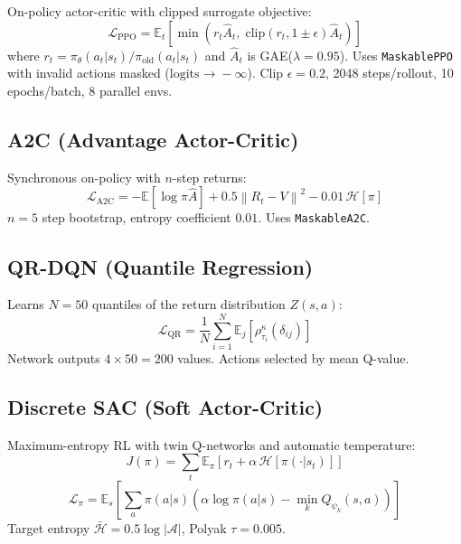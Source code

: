 \documentclass[conference, 10pt]{IEEEtran}
\begin{document}
On-policy actor-critic with clipped surrogate objective:
\begin{equation}
\mathcal{L}_{\text{PPO}}=\mathbb{E}_t\!\left[\min\!\left(r_t\hat{A}_t,\;\text{clip}(r_t,1{\pm}\epsilon)\hat{A}_t\right)\right]
\end{equation}
where $r_t=\pi_\theta(a_t|s_t)/\pi_{\text{old}}(a_t|s_t)$ and $\hat{A}_t$ is GAE($\lambda{=}0.95$).  Uses \texttt{MaskablePPO} with invalid actions masked ($\text{logits}\!\to\!{-}\infty$).  Clip $\epsilon{=}0.2$, 2048 steps/rollout, 10 epochs/batch, 8 parallel envs.

\subsection{A2C (Advantage Actor-Critic)}

Synchronous on-policy with $n$-step returns:
\begin{equation}
\mathcal{L}_{\text{A2C}}=-\mathbb{E}\!\left[\log\pi\hat{A}\right]+0.5\left\|R_t-V\right\|^2-0.01\,\mathcal{H}[\pi]
\end{equation}
$n{=}5$ step bootstrap, entropy coefficient $0.01$.  Uses \texttt{MaskableA2C}.

\subsection{QR-DQN (Quantile Regression)}

Learns $N{=}50$ quantiles of the return distribution $Z(s,a)$:
\begin{equation}
\mathcal{L}_{\text{QR}}=\frac{1}{N}\sum_{i=1}^{N}\mathbb{E}_{j}\!\left[\rho_{\tau_i}^\kappa(\delta_{ij})\right]
\end{equation}
Network outputs $4{\times}50{=}200$ values.  Actions selected by mean Q-value.

\subsection{Discrete SAC (Soft Actor-Critic)}

Maximum-entropy RL with twin Q-networks and automatic temperature:
\begin{equation}
J(\pi)=\sum_t\mathbb{E}_\pi\!\left[r_t+\alpha\,\mathcal{H}\!\left[\pi(\cdot|s_t)\right]\right]
\end{equation}
\begin{equation}
\mathcal{L}_\pi=\mathbb{E}_s\!\left[\sum_a\pi(a|s)\!\left(\alpha\log\pi(a|s)-\min_k Q_{\psi_k}(s,a)\right)\right]
\end{equation}
Target entropy $\bar{\mathcal{H}}{=}0.5\log|\mathcal{A}|$, Polyak $\tau{=}0.005$.
\end{document}
